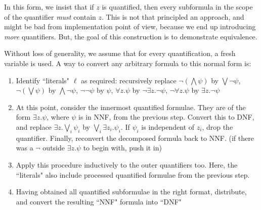 \documentclass{article}
\begin{document}
In this form, we insist that if $z$ is quantified, then every subformula in the scope of the quantifier \emph{must} contain $z$. This is not that principled an approach, and might be bad from implementation point of view, because we end up introducing \emph{more} quantifiers. But, the goal of this construction is to demonstrate equivalence.

Without loss of generality, we assume that for every quantification, a fresh variable is used. A way to convert any arbitrary formula to this normal form is:
\begin{enumerate}
\item Identify ``literals" $\ell$ as required: recursively replace $\neg\left( \bigwedge \psi \right)$ by $\bigvee \neg \psi$, $\neg\left( \bigvee \psi \right)$ by $\bigwedge\neg \psi$, $\neg \neg \psi$ by $\psi$, $\forall z. \psi$ by $\neg \exists z. \neg \psi$, $\neg \forall z. \psi$ by $\exists z. \neg \psi$

\item At this point, consider the innermost quantified formulae. They are of the form $\exists z. \psi$, where $\psi$ is in NNF, from the previous step. Convert this to DNF, and replace $\exists z. \bigvee_i \psi_i$ by $\bigvee_i \exists z_i. \psi_i$. If $\psi_i$ is independent of $z_i$, drop the quantifier. Finally, reconvert the decomposed formula back to NNF. (if there was a $\neg$ outside $\exists z. \psi$ to begin with, push it in)

\item Apply this procedure inductively to the outer quantifiers too. Here, the ``literals" also include processed quantified formulae from the previous step.

\item Having obtained all quantified subformulae in the right format, distribute, and convert the resulting ``NNF" formula into ``DNF"
\end{enumerate}
\end{document}
